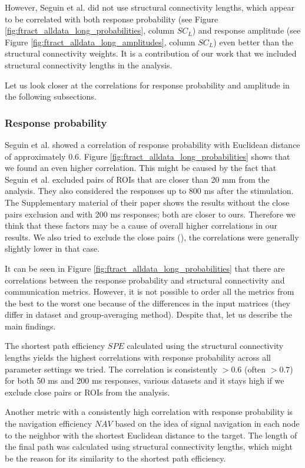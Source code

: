 However, Seguin et al. did not use structural connectivity lengths, which appear to be correlated with both response probability (see Figure \ref{fig:ftract_alldata_long_probabilities}, column $SC_L$) and response amplitude (see Figure \ref{fig:ftract_alldata_long_amplitudes}, column $SC_L$) even better than the structural connectivity weights. It is a contribution of our work that we included structural connectivity lengths in the analysis. 

Let us look closer at the correlations for response probability and amplitude in the following subsections.

\subsubsection{Response probability}\label{sec:probability_F-Tract}

Seguin et al. showed a correlation of response probability with Euclidean distance of approximately $0.6$. Figure \ref{fig:ftract_alldata_long_probabilities} shows that we found an even higher correlation. This might be caused by the fact that Seguin et al. excluded pairs of ROIs that are closer than 20 mm from the analysis. They also considered the responses up to 800 ms after the stimulation. The Supplementary material of their paper shows the results without the close pairs exclusion and with 200 ms responses; both are closer to ours. Therefore we think that these factors may be a cause of overall higher correlations in our results. We also tried to exclude the close pairs (), the correlations were generally slightly lower in that case. 

It can be seen in Figure \ref{fig:ftract_alldata_long_probabilities} that there are correlations between the response probability and structural connectivity and communication metrics. However, it is not possible to order all the metrics from the best to the worst one because of the differences in the input matrices (they differ in dataset and group-averaging method). Despite that, let us describe the main findings.

The shortest path efficiency $SPE$ calculated using the structural connectivity lengths yields the highest correlations with response probability across all parameter settings we tried. The correlation is consistently $>0.6$ (often $>0.7$) for both 50 ms and 200 ms responses, various datasets and it stays high if we exclude close pairs or ROIs from the analysis.

Another metric with a consistently high correlation with response probability is the navigation efficiency $NAV$ based on the idea of signal navigation in each node to the neighbor with the shortest Euclidean distance to the target. The length of the final path was calculated using structural connectivity lengths, which might be the reason for its similarity to the shortest path efficiency.

